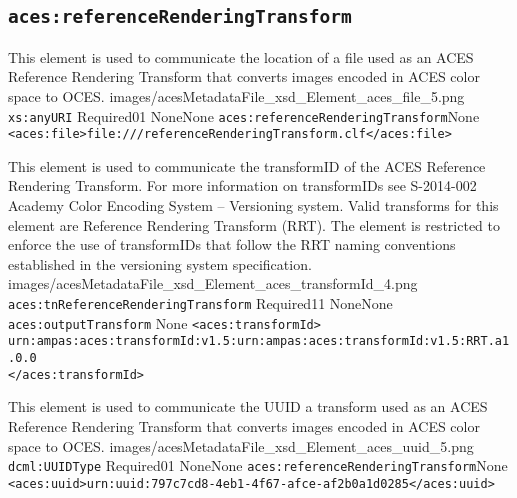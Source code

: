 \subsection{\texttt{aces:referenceRenderingTransform}}

		{This element is used to communicate the location of a file used as an ACES Reference Rendering Transform that converts images encoded in ACES color space to OCES.}
		{images/acesMetadataFile_xsd_Element_aces_file_5.png}
		{\texttt{xs:anyURI}}
		{Required}{0}{1}
		{None}{None}
		{\texttt{aces:referenceRenderingTransform}}{None}
		{\lstinline{<aces:file>file:///referenceRenderingTransform.clf</aces:file>}}
		
        {This element is used to communicate the transformID of the ACES Reference Rendering Transform.  For more information on transformIDs see S-2014-002 Academy Color Encoding System -- Versioning system.  Valid transforms for this element are Reference Rendering Transform (RRT).  The element is restricted to enforce the use of transformIDs that follow the RRT naming conventions established in the versioning system specification.}
        {images/acesMetadataFile_xsd_Element_aces_transformId_4.png}
        {\texttt{aces:tnReferenceRenderingTransform}}
        {Required}{1}{1}
        {None}{None}
        {\texttt{aces:outputTransform}}
        {None}
        {\lstinline{<aces:transformId>}\\
        \lstinline{urn:ampas:aces:transformId:v1.5:urn:ampas:aces:transformId:v1.5:RRT.a1.0.0}\\
        \lstinline{</aces:transformId>}}

		{This element is used to communicate the UUID a transform used as an ACES Reference Rendering Transform that converts images encoded in ACES color space to OCES.}
		{images/acesMetadataFile_xsd_Element_aces_uuid_5.png}
		{\texttt{dcml:UUIDType}}
		{Required}{0}{1}
		{None}{None}
		{\texttt{aces:referenceRenderingTransform}}{None}
		{\lstinline{<aces:uuid>urn:uuid:797c7cd8-4eb1-4f67-afce-af2b0a1d0285</aces:uuid>}}